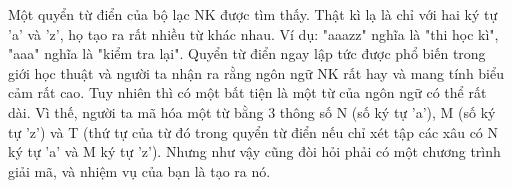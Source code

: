 Một quyển từ điển của bộ lạc NK được tìm thấy. Thật kì lạ là chỉ với hai ký tự 'a' và 'z', họ tạo ra rất nhiều từ khác nhau. Ví dụ: "aaazz" nghĩa là "thi học kì", "aaa" nghĩa là "kiểm tra lại". Quyển từ điển ngay lập tức được phổ biến trong giới học thuật và người ta nhận ra rằng ngôn ngữ NK rất hay và mang tính biểu cảm rất cao. Tuy nhiên thì có một bất tiện là một từ của ngôn ngữ có thể rất dài. Vì thế, người ta mã hóa một từ bằng 3 thông số N (số ký tự 'a'), M (số ký tự 'z') và T (thứ tự của từ đó trong quyển từ điển nếu chỉ xét tập các xâu có N ký tự 'a' và M ký tự 'z'). Nhưng như vậy cũng đòi hỏi phải có một chương trình giải mã, và nhiệm vụ của bạn là tạo ra nó.